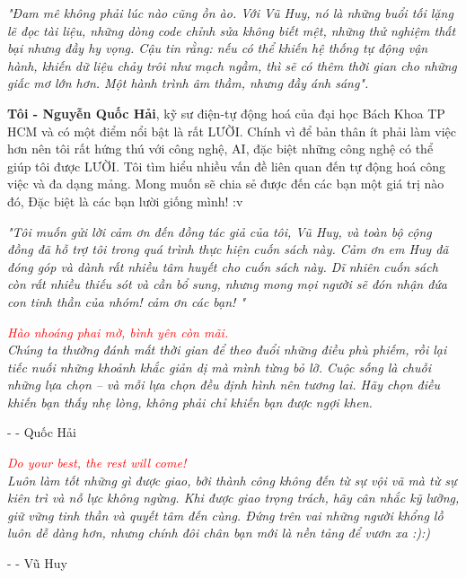 \documentclass[a4paper,12pt,oneside]{book}
\begin{document}
\textit{"Đam mê không phải lúc nào cũng ồn ào. Với Vũ Huy, nó là những buổi tối lặng lẽ đọc tài liệu, những dòng code chỉnh sửa không biết mệt, những thử nghiệm thất bại nhưng đầy hy vọng. Cậu tin rằng: nếu có thể khiến hệ thống tự động vận hành, khiến dữ liệu chảy trôi như mạch ngầm, thì sẽ có thêm thời gian cho những giấc mơ lớn hơn. Một hành trình âm thầm, nhưng đầy ánh sáng".}

\vspace{0.5cm}

\textbf{Tôi - Nguyễn Quốc Hải}, kỹ sư điện-tự động hoá của đại học Bách Khoa TP HCM và có một điểm nổi bật là rất LƯỜI. Chính vì để bản thân ít phải làm việc hơn nên tôi rất hứng thú với công nghệ, AI, đặc biệt những công nghệ có thể giúp tôi được LƯỜI. Tôi tìm hiểu nhiều vấn đề liên quan đến tự động hoá công việc và đa dạng mảng. Mong muốn sẽ chia sẻ được đến các bạn một giá trị nào đó, Đặc biệt là các bạn lười giống mình! :v 

\textit{"Tôi muốn gửi lời cảm ơn đến đồng tác giả của tôi, Vũ Huy, và toàn bộ cộng đồng đã hỗ trợ tôi trong quá trình thực hiện cuốn sách này. Cảm ơn em Huy đã đóng góp và dành rất nhiều tâm huyết cho cuốn sách này. Dĩ nhiên cuốn sách còn rất nhiều thiếu sót và cần bổ sung, nhưng mong mọi người sẽ đón nhận đứa con tinh thần của nhóm! cảm ơn các bạn! "}


\newpage
\thispagestyle{empty}

\noindent\vspace{5cm}

\begin{center}
\textit{ \textcolor{red}{Hào nhoáng phai mờ, bình yên còn mãi.}\\
	Chúng ta thường đánh mất thời gian để theo đuổi những điều phù phiếm, rồi lại tiếc nuối những khoảnh khắc giản dị mà mình từng bỏ lỡ. Cuộc sống là chuỗi những lựa chọn – và mỗi lựa chọn đều định hình nên tương lai. Hãy chọn điều khiến bạn thấy nhẹ lòng, không phải chỉ khiến bạn được ngợi khen.}

\vspace{0.5cm}
\hspace{10cm}
- - Quốc Hải 
\end{center}

\vspace{2cm}

\begin{center}
\textit{\textcolor{red}{Do your best, the rest will come!}\\
	Luôn làm tốt những gì được giao, bởi thành công không đến từ sự vội vã mà từ sự kiên trì và nỗ lực không ngừng. Khi được giao trọng trách, hãy cân nhắc kỹ lưỡng, giữ vững tinh thần và quyết tâm đến cùng. Đứng trên vai những người khổng lồ luôn dễ dàng hơn, nhưng chính đôi chân bạn mới là nền tảng để vươn xa :):)}

\vspace{0.5cm}
\hspace{10cm}
- - Vũ Huy
\end{center}
\end{document}
